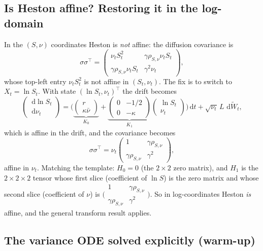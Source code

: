 \documentclass[11pt]{article}
\newcommand{\dd}{\,\mathrm{d}}
\begin{document}
\subsection{Is Heston affine? Restoring it in the log-domain}

In the $(S,\nu)$ coordinates Heston is \emph{not} affine: the diffusion covariance is
\[
\sigma\sigma^\top =
\begin{pmatrix} \nu_t S_t^2 & \gamma\rho_{S,\nu}\nu_t S_t \\
\gamma\rho_{S,\nu}\nu_t S_t & \gamma^2\nu_t \end{pmatrix},
\]
whose top-left entry $\nu_t S_t^2$ is not affine in $(S_t,\nu_t)$. The fix is to switch to
$X_t=\ln S_t$. With state $(\ln S_t,\nu_t)^\top$ the drift becomes
\[
\begin{pmatrix} \dd\ln S_t\\ \dd\nu_t\end{pmatrix}
=\Bigg(
\underbrace{\begin{pmatrix} r\\ \kappa\bar\nu\end{pmatrix}}_{K_0}
+\underbrace{\begin{pmatrix} 0 & -1/2\\ 0 & -\kappa\end{pmatrix}}_{K_1}
\begin{pmatrix}\ln S_t\\ \nu_t\end{pmatrix}
\Bigg)\dd t + \sqrt{\nu_t}\,L\,\dd\widetilde W_t,
\]
which is affine in the drift, and the covariance becomes
\[
\sigma\sigma^\top = \nu_t
\begin{pmatrix} 1 & \gamma\rho_{S,\nu}\\ \gamma\rho_{S,\nu} & \gamma^2\end{pmatrix},
\]
affine in $\nu_t$. Matching the template: $H_0=0$ (the $2\times2$ zero matrix), and $H_1$
is the $2\times2\times2$ tensor whose first slice (coefficient of $\ln S$) is the zero
matrix and whose second slice (coefficient of $\nu$) is
$\big(\begin{smallmatrix} 1 & \gamma\rho_{S,\nu}\\ \gamma\rho_{S,\nu} & \gamma^2\end{smallmatrix}\big)$.
So in log-coordinates Heston \emph{is} affine, and the general transform result applies.

\subsection{The variance ODE solved explicitly (warm-up)}
\end{document}
